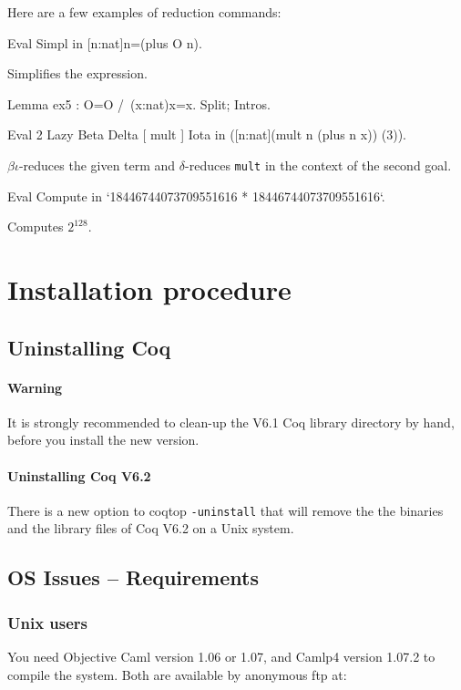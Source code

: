\documentclass[11pt]{article}
\begin{document}
\begin{coq_example*}
Here are a few examples of reduction commands:
\begin{coq_example}
Eval Simpl in [n:nat]n=(plus O n).
\end{coq_example}
Simplifies the expression.
\begin{coq_example*}
Lemma ex5 : O=O /\ (x:nat)x=x.
Split; Intros.
\end{coq_example*}
\begin{coq_example}
Eval 2 Lazy Beta Delta [ mult ] Iota in ([n:nat](mult n (plus n x)) (3)).
\end{coq_example}

$\beta\iota$-reduces the given term and $\delta$-reduces \verb+mult+ in the
context of the second goal.

\begin{coq_example}
Eval Compute in `18446744073709551616 * 18446744073709551616`.
\end{coq_example}

Computes $2^{128}$.

\section{Installation procedure}

\subsection{Uninstalling Coq}

\paragraph{Warning} 
It is strongly recommended to clean-up the V6.1 Coq library directory
by hand, before you install the new version.
\paragraph{Uninstalling Coq V6.2}
There is a new option to coqtop \texttt{-uninstall} that will remove
the the binaries and the library files of Coq V6.2 on a Unix system.


\subsection{OS Issues -- Requirements}

\subsubsection{Unix users}
You need Objective Caml version 1.06 or 1.07, and Camlp4 version 1.07.2
to compile the system. Both are available by anonymous ftp
at:


\end{coq_example*}
\end{document}
